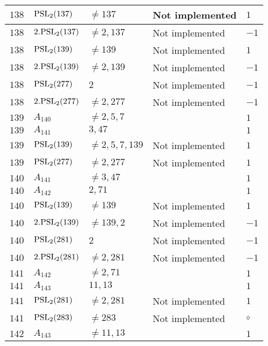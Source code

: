 \documentclass[a4paper, 11pt]{article}
\begin{document}
\begin{longtable}{lllll}
        $ 138 $ & $ {\rm PSL}_{2}(137) $ & $ \neq 137 $ & Not implemented & $ 1  $ \\ \hline
        $ 138 $ & $ 2.{\rm PSL}_{2}(137) $ & $ \neq 2, 137 $ & Not implemented & $ -1  $ \\ \hline
        $ 138 $ & $ {\rm PSL}_{2}(139) $ & $ \neq 139 $ & Not implemented & $ 1  $ \\ \hline
        $ 138 $ & $ 2.{\rm PSL}_{2}(139) $ & $ \neq 2, 139 $ & Not implemented & $ -1  $ \\ \hline
        $ 138 $ & $ {\rm PSL}_{2}(277) $ & $ 2 $ & Not implemented & $ -1  $ \\ \hline
        $ 138 $ & $ 2.{\rm PSL}_{2}(277) $ & $ \neq 2, 277 $ & Not implemented & $ -1  $ \\ \hline
        $ 139 $ & $ A_{140} $ & $ \neq 2, 5, 7 $ & $ ~ $ & $ 1  $ \\ \hline
        $ 139 $ & $ A_{141} $ & $ 3, 47 $ & $ ~ $ & $ 1  $ \\ \hline
        $ 139 $ & $ {\rm PSL}_{2}(139) $ & $ \neq 2, 5, 7, 139 $ & Not implemented & $ 1  $ \\ \hline
        $ 139 $ & $ {\rm PSL}_{2}(277) $ & $ \neq 2, 277 $ & Not implemented & $ 1  $ \\ \hline
        $ 140 $ & $ A_{141} $ & $ \neq 3, 47 $ & $ ~ $ & $ 1  $ \\ \hline
        $ 140 $ & $ A_{142} $ & $ 2, 71 $ & $ ~ $ & $ 1  $ \\ \hline
        $ 140 $ & $ {\rm PSL}_{2}(139) $ & $ \neq 139 $ & Not implemented & $ 1  $ \\ \hline
        $ 140 $ & $ 2.{\rm PSL}_{2}(139) $ & $ \neq 139, 2 $ & Not implemented & $ -1  $ \\ \hline
        $ 140 $ & $ {\rm PSL}_{2}(281) $ & $ 2 $ & Not implemented & $ -1  $ \\ \hline
        $ 140 $ & $ 2.{\rm PSL}_{2}(281) $ & $ \neq 2, 281 $ & Not implemented & $ -1  $ \\ \hline
        $ 141 $ & $ A_{142} $ & $ \neq 2, 71 $ & $ ~ $ & $ 1  $ \\ \hline
        $ 141 $ & $ A_{143} $ & $ 11, 13 $ & $ ~ $ & $ 1  $ \\ \hline
        $ 141 $ & $ {\rm PSL}_{2}(281) $ & $ \neq 2, 281 $ & Not implemented & $ 1  $ \\ \hline
        $ 141 $ & $ {\rm PSL}_{2}(283) $ & $ \neq 283 $ & Not implemented & $\circ$ \\ \hline
        $ 142 $ & $ A_{143} $ & $ \neq 11, 13 $ & $ ~ $ & $ 1  $ \\ \hline

\end{longtable}
\end{document}
